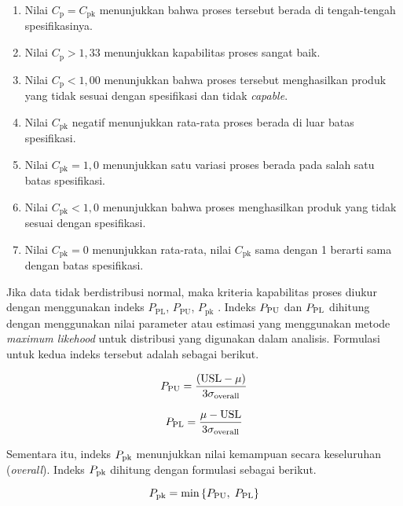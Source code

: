 \begin{enumerate}[label=\alph*., nosep, align=left, labelwidth=\parindent, labelsep=0pt]
    \item Nilai $C_{\mathrm{p}} = C_{\mathrm{pk}}$ menunjukkan bahwa proses tersebut berada di tengah-tengah spesifikasinya.
    \item Nilai $C_{\mathrm{p}} > 1{,}33$ menunjukkan kapabilitas proses sangat baik.
    \item Nilai $C_{\mathrm{p}} < 1{,}00$ menunjukkan bahwa proses tersebut menghasilkan produk yang tidak sesuai dengan spesifikasi dan tidak \textit{capable}.
    \item Nilai $C_{\mathrm{pk}}$ negatif menunjukkan rata-rata proses berada di luar batas spesifikasi.
    \item Nilai $C_{\mathrm{pk}} = 1{,}0$ menunjukkan satu variasi proses berada pada salah satu batas spesifikasi.
    \item Nilai $C_{\mathrm{pk}} < 1{,}0$ menunjukkan bahwa proses menghasilkan produk yang tidak sesuai dengan spesifikasi.
    \item Nilai $C_{\mathrm{pk}} = 0$ menunjukkan rata-rata, nilai $C_{\mathrm{pk}}$ sama dengan 1 berarti sama dengan batas spesifikasi.
\end{enumerate}

Jika data tidak berdistribusi normal, maka kriteria kapabilitas proses diukur dengan menggunakan indeks $P_{\mathrm{PL}}$, $P_{\mathrm{PU}}$, $P_{\mathrm{pk}}$ \cite{lahcene2018}. Indeks $P_{\mathrm{P}\mathrm{U}}$ dan $P_{\mathrm{P}\mathrm{L}}$ dihitung dengan menggunakan nilai parameter atau estimasi yang menggunakan metode \textit{maximum likehood} untuk distribusi yang digunakan dalam analisis. Formulasi untuk kedua indeks tersebut adalah sebagai berikut.

\begin{equation}
    P_{\mathrm{P}\mathrm{U}} = \frac{(\text{USL} - \mu)}{3\sigma_{\text{overall}}}  \label{eq:3}
\end{equation}

\begin{equation}
    P_{\mathrm{P}\mathrm{L}} = \frac{\mu - \text{USL}}{3\sigma_{\text{overall}}}  \label{eq:4}
\end{equation}

Sementara itu, indeks $P_{\mathrm{p}\mathrm{k}}$ menunjukkan nilai kemampuan secara keseluruhan (\textit{overall}). Indeks $P_{\mathrm{p}\mathrm{k}}$ dihitung dengan formulasi sebagai berikut.

\begin{equation}
    P_{\mathrm{p}\mathrm{k}} = \text{min}\left\{ P_{\mathrm{P}\mathrm{U}},\; P_{\mathrm{P}\mathrm{L}} \right\}  \label{eq:5}
\end{equation}


